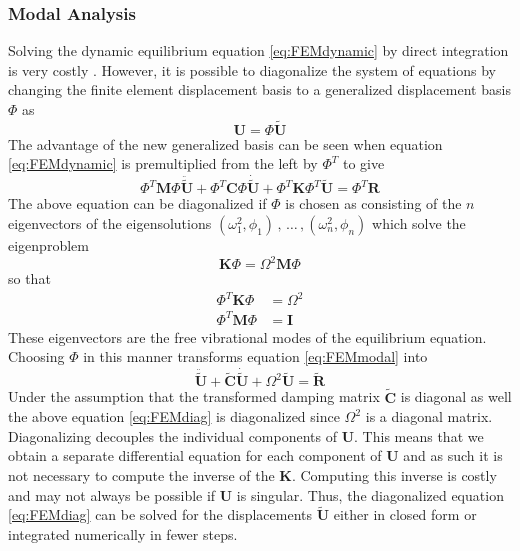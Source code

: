 \documentclass[11pt,a4paper]{report}
\begin{document}
\subsubsection{Modal Analysis}
Solving the dynamic equilibrium equation \ref{eq:FEMdynamic} by direct integration
is very costly \cite{FEMbook}. However, it is possible to diagonalize the system
of equations by changing the finite element displacement basis to a generalized displacement
basis $\Phi$ as 
\begin{equation}
\mathbf{U} = \Phi \mathbf{\tilde{U}}
\end{equation}
The advantage of the new generalized basis can be seen when equation \ref{eq:FEMdynamic} is premultiplied from the left by $\Phi^T$
to give
\begin{equation}\label{eq:FEMmodal}
\Phi^T\mathbf{M}\Phi\mathbf{\ddot{\tilde{U}}} + \Phi^T\mathbf{C}\Phi\mathbf{\dot{\tilde{U}}} + \Phi^T\mathbf{K}\Phi^T\mathbf{\tilde{U}}
= \Phi^T\mathbf{R}
\end{equation}
The above equation can be diagonalized if $\Phi$ is chosen as consisting of the $n$ eigenvectors of the eigensolutions $(\omega_1^2,\phi_1)\,,\, \dots \,,(\omega_n^2,\phi_n)$ which solve the eigenproblem
\begin{equation}\label{eq:FEMbasis}
\mathbf{K}\Phi = \Omega^2\mathbf{M}\Phi
\end{equation}
so that 
\begin{align}
\Phi^T\mathbf{K}\Phi &= \Omega^2\\
\Phi^T\mathbf{M}\Phi &= \mathbf{I}
\end{align}
These eigenvectors are the free vibrational modes of the equilibrium equation. Choosing $\Phi$ in this manner transforms equation \ref{eq:FEMmodal} into
\begin{equation}\label{eq:FEMdiag}
\mathbf{\ddot{\tilde{U}}} + \mathbf{\tilde{C}}\mathbf{\dot{\tilde{U}}} + \Omega^2\mathbf{\tilde{U}}
= \mathbf{\tilde{R}}
\end{equation}
Under the assumption that the transformed damping matrix $\mathbf{\tilde{C}}$ is
diagonal as well the above equation \ref{eq:FEMdiag} is diagonalized since
$\Omega^2$ is a diagonal matrix.
Diagonalizing
decouples the individual components of $\mathbf{U}$. This means that we obtain a
separate differential equation for each component of $\mathbf{U}$ and as such it
is not necessary to compute the inverse of the $\mathbf{K}$. Computing this
inverse is costly and may not always be possible if $\mathbf{U}$ is singular. Thus, the
diagonalized equation \ref{eq:FEMdiag} can be solved for the displacements
$\mathbf{\tilde{U}}$ either in closed form or integrated numerically in fewer steps.
\end{document}
